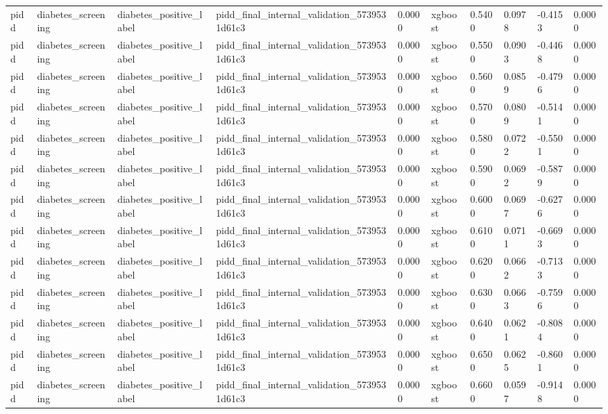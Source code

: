 \begin{tabular}{llllllllll}
pidd & diabetes\_screening & diabetes\_positive\_label & pidd\_final\_internal\_validation\_5739531d61c3 & 0.0000 & xgboost & 0.5400 & 0.0978 & -0.4153 & 0.0000 \\
pidd & diabetes\_screening & diabetes\_positive\_label & pidd\_final\_internal\_validation\_5739531d61c3 & 0.0000 & xgboost & 0.5500 & 0.0903 & -0.4468 & 0.0000 \\
pidd & diabetes\_screening & diabetes\_positive\_label & pidd\_final\_internal\_validation\_5739531d61c3 & 0.0000 & xgboost & 0.5600 & 0.0859 & -0.4796 & 0.0000 \\
pidd & diabetes\_screening & diabetes\_positive\_label & pidd\_final\_internal\_validation\_5739531d61c3 & 0.0000 & xgboost & 0.5700 & 0.0809 & -0.5141 & 0.0000 \\
pidd & diabetes\_screening & diabetes\_positive\_label & pidd\_final\_internal\_validation\_5739531d61c3 & 0.0000 & xgboost & 0.5800 & 0.0722 & -0.5501 & 0.0000 \\
pidd & diabetes\_screening & diabetes\_positive\_label & pidd\_final\_internal\_validation\_5739531d61c3 & 0.0000 & xgboost & 0.5900 & 0.0692 & -0.5879 & 0.0000 \\
pidd & diabetes\_screening & diabetes\_positive\_label & pidd\_final\_internal\_validation\_5739531d61c3 & 0.0000 & xgboost & 0.6000 & 0.0697 & -0.6276 & 0.0000 \\
pidd & diabetes\_screening & diabetes\_positive\_label & pidd\_final\_internal\_validation\_5739531d61c3 & 0.0000 & xgboost & 0.6100 & 0.0711 & -0.6693 & 0.0000 \\
pidd & diabetes\_screening & diabetes\_positive\_label & pidd\_final\_internal\_validation\_5739531d61c3 & 0.0000 & xgboost & 0.6200 & 0.0662 & -0.7133 & 0.0000 \\
pidd & diabetes\_screening & diabetes\_positive\_label & pidd\_final\_internal\_validation\_5739531d61c3 & 0.0000 & xgboost & 0.6300 & 0.0663 & -0.7596 & 0.0000 \\
pidd & diabetes\_screening & diabetes\_positive\_label & pidd\_final\_internal\_validation\_5739531d61c3 & 0.0000 & xgboost & 0.6400 & 0.0621 & -0.8084 & 0.0000 \\
pidd & diabetes\_screening & diabetes\_positive\_label & pidd\_final\_internal\_validation\_5739531d61c3 & 0.0000 & xgboost & 0.6500 & 0.0625 & -0.8601 & 0.0000 \\
pidd & diabetes\_screening & diabetes\_positive\_label & pidd\_final\_internal\_validation\_5739531d61c3 & 0.0000 & xgboost & 0.6600 & 0.0597 & -0.9148 & 0.0000 \\

\end{tabular}
